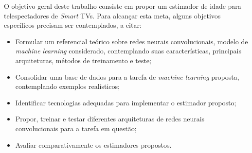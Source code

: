 O objetivo geral deste trabalho consiste em propor um estimador de idade para telespectadores de \emph{Smart} TVs. Para alcançar esta meta, alguns objetivos específicos precisam ser contemplados, a citar:

\begin{itemize}
     \item Formular um referencial teórico sobre redes neurais convolucionais, modelo de \emph{machine learning} considerado, contemplando suas características, principais arquiteturas, métodos de treinamento e teste;
     \item Consolidar uma base de dados para a tarefa de \emph{machine learning} proposta, contemplando exemplos realísticos;
     \item Identificar tecnologias adequadas para implementar o estimador proposto;
     \item Propor, treinar e testar diferentes arquiteturas  de redes neurais convolucionais para a tarefa em questão;
     \item Avaliar comparativamente os estimadores propostos.
\end{itemize}
